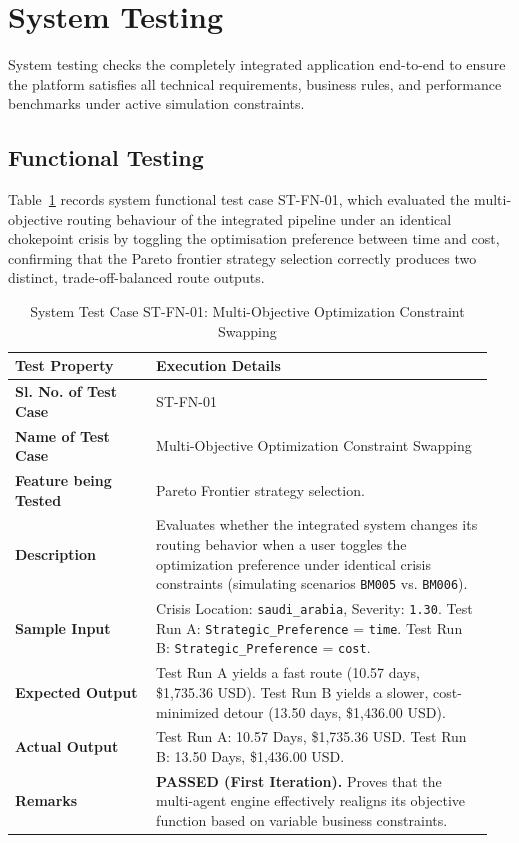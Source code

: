 \section{System Testing}
System testing checks the completely integrated application end-to-end to ensure the platform satisfies all technical requirements, business rules, and performance benchmarks under active simulation constraints.

\subsection{Functional Testing}
Table~\ref{tab:stfn01} records system functional test case ST-FN-01, which evaluated the multi-objective routing behaviour of the integrated pipeline under an identical chokepoint crisis by toggling the optimisation preference between time and cost, confirming that the Pareto frontier strategy selection correctly produces two distinct, trade-off-balanced route outputs.

\begin{table}[H]
    \centering
    \caption{System Test Case ST-FN-01: Multi-Objective Optimization Constraint Swapping}
    \label{tab:stfn01}
    \begin{tabular}{|p{0.28\linewidth}|p{0.67\linewidth}|}
        \hline
        \textbf{Test Property} & \textbf{Execution Details} \\ \hline
        \textbf{Sl. No. of Test Case} & ST-FN-01 \\ \hline
        \textbf{Name of Test Case} & Multi-Objective Optimization Constraint Swapping \\ \hline
        \textbf{Feature being Tested} & Pareto Frontier strategy selection. \\ \hline
        \textbf{Description} & Evaluates whether the integrated system changes its routing behavior when a user toggles the optimization preference under identical crisis constraints (simulating scenarios \texttt{BM005} vs. \texttt{BM006}). \\ \hline
        \textbf{Sample Input} & Crisis Location: \texttt{saudi\_arabia}, Severity: \texttt{1.30}. Test Run A: \texttt{Strategic\_Preference} = \texttt{time}. Test Run B: \texttt{Strategic\_Preference} = \texttt{cost}. \\ \hline
        \textbf{Expected Output} & Test Run A yields a fast route (10.57 days, \$1,735.36 USD). Test Run B yields a slower, cost-minimized detour (13.50 days, \$1,436.00 USD). \\ \hline
        \textbf{Actual Output} & Test Run A: 10.57 Days, \$1,735.36 USD. Test Run B: 13.50 Days, \$1,436.00 USD. \\ \hline
        \textbf{Remarks} & \textbf{PASSED (First Iteration).} Proves that the multi-agent engine effectively realigns its objective function based on variable business constraints. \\ \hline
    \end{tabular}
\end{table}

